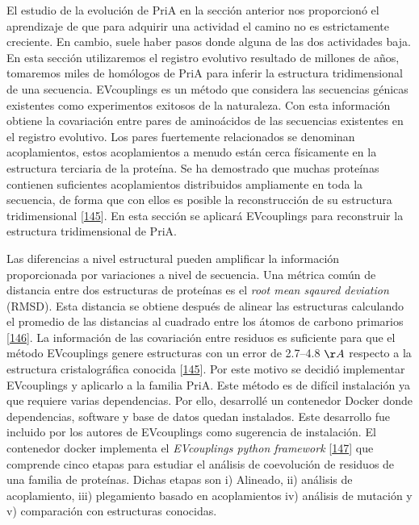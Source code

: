 \documentclass[12pt,twoside]{reedthesis}
\begin{document}
  El estudio de la evolución de PriA en la sección anterior nos
  proporcionó el aprendizaje de que para adquirir una actividad el camino
  no es estrictamente creciente. En cambio, suele haber pasos donde alguna
  de las dos actividades baja. En esta sección utilizaremos el registro
  evolutivo resultado de millones de años, tomaremos miles de homólogos de
  PriA para inferir la estructura tridimensional de una secuencia.
  EVcouplings es un método que considera las secuencias génicas existentes
  como experimentos exitosos de la naturaleza. Con esta información
  obtiene la covariación entre pares de aminoácidos de las secuencias
  existentes en el registro evolutivo. Los pares fuertemente relacionados
  se denominan acoplamientos, estos acoplamientos a menudo están cerca
  físicamente en la estructura terciaria de la proteína. Se ha demostrado
  que muchas proteínas contienen suficientes acoplamientos distribuidos
  ampliamente en toda la secuencia, de forma que con ellos es posible la
  reconstrucción de su estructura tridimensional
  {[}\protect\hyperlink{ref-marks_protein_2011}{145}{]}. En esta sección
  se aplicará EVcouplings para reconstruir la estructura tridimensional de
  PriA.
  
  Las diferencias a nivel estructural pueden amplificar la información
  proporcionada por variaciones a nivel de secuencia. Una métrica común de
  distancia entre dos estructuras de proteínas es el \emph{root mean
  sqaured deviation} (RMSD). Esta distancia se obtiene después de alinear
  las estructuras calculando el promedio de las distancias al cuadrado
  entre los átomos de carbono primarios
  {[}\protect\hyperlink{ref-kufareva_methods_2012}{146}{]}. La información
  de las covariación entre residuos es suficiente para que el método
  EVcouplings genere estructuras con un error de 2.7--4.8 \({\AA}\)
  respecto a la estructura cristalográfica conocida
  {[}\protect\hyperlink{ref-marks_protein_2011}{145}{]}. Por este motivo
  se decidió implementar EVcouplings y aplicarlo a la familia PriA. Este
  método es de difícil instalación ya que requiere varias dependencias.
  Por ello, desarrollé un contenedor Docker donde dependencias, software y
  base de datos quedan instalados. Este desarrollo fue incluido por los
  autores de EVcouplings como sugerencia de instalación. El contenedor
  docker implementa el \emph{EVcouplings python framework}
  {[}\protect\hyperlink{ref-hopf_evcouplings_2019}{147}{]} que comprende
  cinco etapas para estudiar el análisis de coevolución de residuos de una
  familia de proteínas. Dichas etapas son i) Alineado, ii) análisis de
  acoplamiento, iii) plegamiento basado en acoplamientos iv) análisis de
  mutación y v) comparación con estructuras conocidas.
  
\end{document}
